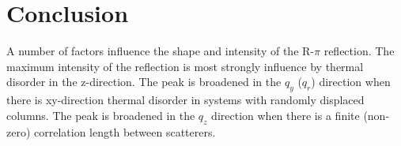 \documentclass{article}
\begin{document}
  \section{Conclusion}
  
  A number of factors influence the shape and intensity of the R-$\pi$
  reflection. The maximum intensity of the reflection is most strongly influence
  by thermal disorder in the z-direction. The peak is broadened in the $q_y$ ($q_r$)
  direction when there is xy-direction thermal disorder in systems with randomly displaced 
  columns. The peak is broadened in the $q_z$ direction when there is a finite (non-zero)
  correlation length between scatterers.
 
\end{document}
